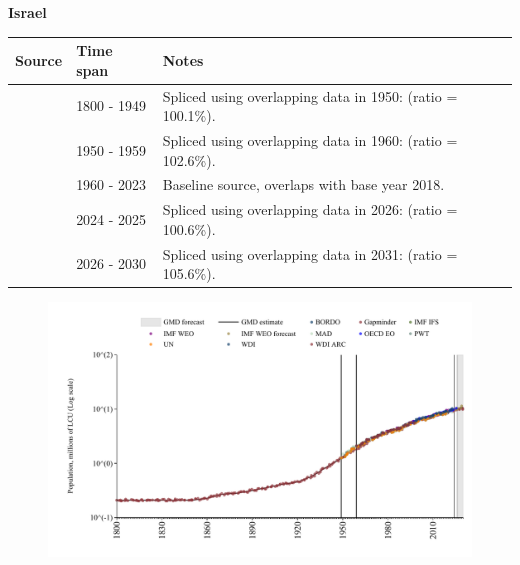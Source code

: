\documentclass[12pt,a4paper,landscape]{article}
\begin{document}
\begin{adjustbox}{max totalsize={\paperwidth}{\paperheight},center}
\begin{minipage}[t][\textheight][t]{\textwidth}
\vspace*{0.5cm}
{}
\begin{center}
{\Large\bfseries Israel}
\end{center}
\vspace{0.5cm}
\begin{table}[H]
\centering
\small
\begin{tabular}{|l|l|l|}
\hline
\textbf{Source} & \textbf{Time span} & \textbf{Notes} \\
\hline
\rowcolor{white}\cite{Gapminder}& 1800 - 1949 &Spliced using overlapping data in 1950: (ratio = 100.1\%).\\
\rowcolor{lightgray}\cite{IMF_IFS}& 1950 - 1959 &Spliced using overlapping data in 1960: (ratio = 102.6\%).\\
\rowcolor{white}\cite{WDI}& 1960 - 2023 &Baseline source, overlaps with base year 2018.\\
\rowcolor{lightgray}\cite{OECD_EO}& 2024 - 2025 &Spliced using overlapping data in 2026: (ratio = 100.6\%).\\
\rowcolor{white}\cite{Gapminder}& 2026 - 2030 &Spliced using overlapping data in 2031: (ratio = 105.6\%).\\
\hline
\end{tabular}
\end{table}
\begin{figure}[H]
\centering
\includegraphics[width=\textwidth,height=0.6\textheight,keepaspectratio]{graphs/ISR_pop.pdf}
\end{figure}
\end{minipage}
\end{adjustbox}
\end{document}
